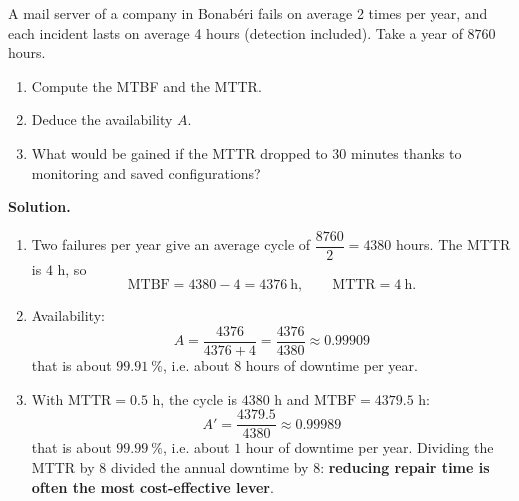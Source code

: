 \documentclass[11pt]{article}
\begin{document}
\begin{exoresolu}
A mail server of a company in Bonabéri fails on average 2 times per year, and each incident lasts on average 4 hours (detection included). Take a year of $8760$ hours.
\begin{enumerate}
\item Compute the MTBF and the MTTR.
\item Deduce the availability $A$.
\item What would be gained if the MTTR dropped to 30 minutes thanks to monitoring and saved configurations?
\end{enumerate}
\tcblower
\textbf{Solution.}
\begin{enumerate}
\item Two failures per year give an average cycle of $\dfrac{8760}{2} = 4380$ hours. The MTTR is $4$ h, so
\[ \mathrm{MTBF} = 4380 - 4 = 4376\ \mathrm{h}, \qquad \mathrm{MTTR} = 4\ \mathrm{h}. \]
\item Availability:
\[ A = \frac{4376}{4376 + 4} = \frac{4376}{4380} \approx 0.99909 \]
that is about $99.91\ \%$, i.e. about $8$ hours of downtime per year.
\item With $\mathrm{MTTR} = 0.5$ h, the cycle is $4380$ h and $\mathrm{MTBF} = 4379.5$ h:
\[ A' = \frac{4379.5}{4380} \approx 0.99989 \]
that is about $99.99\ \%$, i.e. about $1$ hour of downtime per year. Dividing the MTTR by 8 divided the annual downtime by 8: \textbf{reducing repair time is often the most cost-effective lever}.
\end{enumerate}
\end{exoresolu}
\end{document}
